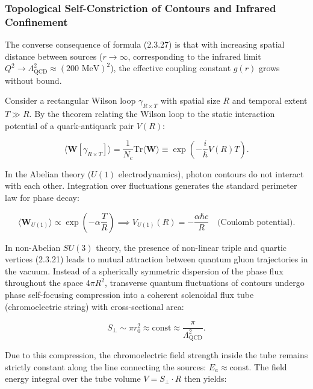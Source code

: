\subsubsection{Topological Self-Constriction of Contours and Infrared Confinement}\label{sec:2.3.5}

The converse consequence of formula (2.3.27) is that with increasing spatial distance between sources ($r \to \infty$, corresponding to the infrared limit $Q^2 \to \Lambda_{\text{QCD}}^2 \approx (200\text{ MeV})^2$), the effective coupling constant $g(r)$ grows without bound.

Consider a rectangular Wilson loop $\gamma_{R \times T}$ with spatial size $R$ and temporal extent $T \gg R$. By the theorem relating the Wilson loop to the static interaction potential of a quark-antiquark pair $V(R)$:

\begin{equation}\label{eq:2.3.28}\tag{2.3.28}
\langle \mathbf{W}[\gamma_{R \times T}] \rangle = \frac{1}{N_c} \text{Tr}\langle \mathbf{W} \rangle \equiv \exp\left( - \frac{i}{\hbar} V(R) T \right).
\end{equation}

In the Abelian theory ($U(1)$ electrodynamics), photon contours do not interact with each other. Integration over fluctuations generates the standard perimeter law for phase decay:

\begin{equation}\label{eq:2.3.29}\tag{2.3.29}
\langle \mathbf{W}_{U(1)} \rangle \propto \exp\left( - \alpha \frac{T}{R} \right) \implies V_{U(1)}(R) = - \frac{\alpha \hbar c}{R} \quad \text{(Coulomb potential)}.
\end{equation}

In non-Abelian $SU(3)$ theory, the presence of non-linear triple and quartic vertices (2.3.21) leads to mutual attraction between quantum gluon trajectories in the vacuum. Instead of a spherically symmetric dispersion of the phase flux throughout the space $4\pi R^2$, transverse quantum fluctuations of contours undergo phase self-focusing compression into a coherent solenoidal flux tube (chromoelectric string) with cross-sectional area:

\begin{equation}\label{eq:2.3.30}\tag{2.3.30}
S_\perp \sim \pi r_0^2 \approx \text{const} \approx \frac{\pi}{\Lambda_{\text{QCD}}^2}.
\end{equation}

Due to this compression, the chromoelectric field strength inside the tube remains strictly constant along the line connecting the sources: $E_a \approx \text{const}$. The field energy integral over the tube volume $V = S_\perp \cdot R$ then yields:

